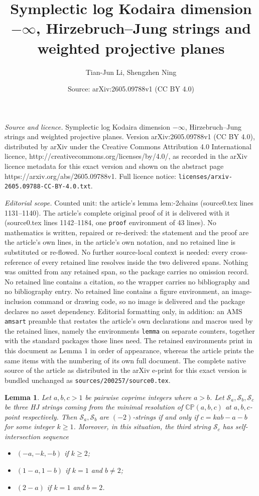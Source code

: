 \documentclass[10pt,a4paper]{amsart}
\title{Symplectic log Kodaira dimension $-\infty$, Hirzebruch--Jung strings and weighted projective planes}
\author{Tian-Jun Li, Shengzhen Ning}
\date{Source: arXiv:2605.09788v1 (CC BY 4.0)}
\newtheorem{lemma}{Lemma}
\newcommand{\st}{\mathcal{S}}
\begin{document}
\maketitle

\noindent\emph{Source and licence.} Symplectic log Kodaira dimension $-\infty$, Hirzebruch--Jung strings and weighted projective planes. Version arXiv:2605.09788v1 (CC BY 4.0), distributed by arXiv under the Creative Commons Attribution 4.0 International licence, http://creativecommons.org/licenses/by/4.0/, as recorded in the arXiv licence metadata for this exact version and shown on the abstract page https://arxiv.org/abs/2605.09788v1. Full licence notice: \texttt{licenses/arxiv-2605.09788-CC-BY-4.0.txt}.\par\smallskip

\noindent\textit{Editorial scope.} Counted unit: the article's lemma lem:-2chains (source0.tex lines 1131--1140). The article's complete original proof of it is delivered with it (source0.tex lines 1142--1184, one \texttt{proof} environment of 43 lines). No mathematics is written, repaired or re-derived: the statement and the proof are the article's own lines, in the article's own notation, and no retained line is substituted or re-flowed.  No further source-local context is needed: every cross-reference of every retained line resolves inside the two delivered spans.  Nothing was omitted from any retained span, so the package carries no omission record.  No retained line contains a citation, so the wrapper carries no bibliography and no bibliography entry.  No retained line contains a figure environment, an image-inclusion command or drawing code, so no image is delivered and the package declares no asset dependency.  Editorial formatting only, in addition: an AMS \texttt{amsart} preamble that restates the article's own declarations and macros used by the retained lines, namely the environments \texttt{lemma} on separate counters, together with the standard packages those lines need.  The retained environments print in this document as Lemma 1 in order of appearance, whereas the article prints the same items with the numbering of its own full document.  The complete native source of the article as distributed in the arXiv e-print for this exact version is bundled unchanged as \texttt{sources/200257/source0.tex}.
\begin{lemma}\label{lem:-2chains}
Let $a,b,c>1$ be pairwise coprime integers where $a>b$. Let $\st_a,\st_b,\st_c$ be three HJ strings coming from the minimal resolution of $\mathbb{CP}(a,b,c)$ at $a,b,c$-point respectively. Then $\st_a,\st_b$ are $(-2)$-strings if and only if $c=kab-a-b$ for some integer $k\ge 1$.
Moreover, in this situation, the third string $\st_c$ has self-intersection sequence
\begin{itemize}[nosep]
    \item $(-a,-k,-b)$ if $k\ge 2$; 
    \item $(1-a,1-b)$ if $k=1$ and $b\neq 2$;
    \item $(2-a)$ if $k=1$ and $b=2$.
\end{itemize}

\end{lemma}
\end{document}
